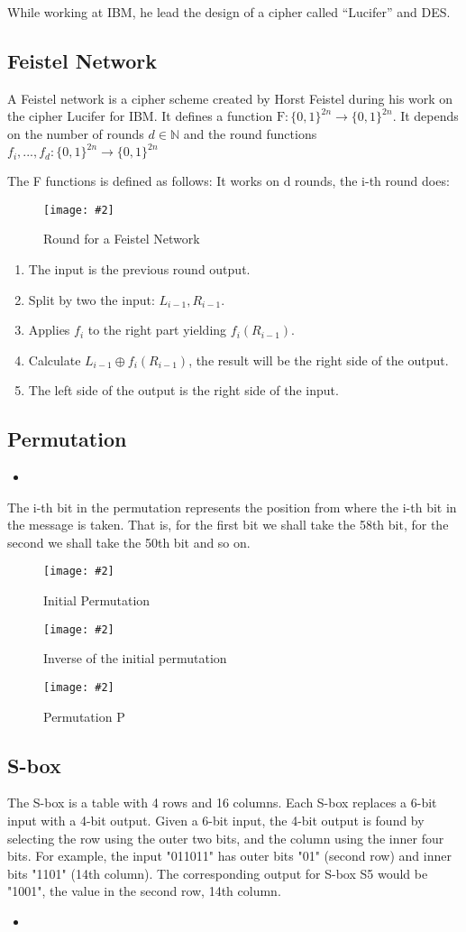 \documentclass[titlepage, 12pt]{article}
\numberwithin{equation}{section}%
\numberwithin{figure}{section}%
\numberwithin{table}{section}%
\newcommand{\imagen}[4][]{
	\begin{figure}[H]
		\centering
		\texttt{[image: \#2]}
		\caption{#3}
		#4
	\end{figure}
}
\newcommand{\delimitCodeScript}[6][]{
	\begin{itemize}
		\item[]
	\end{itemize}	
}
\begin{document}
		While working at IBM, he lead the design of a cipher called ``Lucifer'' and DES.\cite{feistelbiography}
		\subsection{Feistel Network}
		A Feistel network is a cipher scheme created by Horst Feistel during his work on the cipher Lucifer for IBM. It defines a function $\text{F}: \{0,1\}^{2n} \rightarrow\{0,1\}^{2n}$. It depends on the number of rounds $d \in \mathbb{N}$ and the round functions $f_{i}, ..., f_{d}: \{0,1\}^{2n} \rightarrow\{0,1\}^{2n}$
		
		The F functions is defined as follows: It works on d rounds, the i-th round does:
		\imagen[]{Picture1}{Round for a Feistel Network}{\label{FeistelRound}}
		\begin{enumerate}
			\item The input is the previous round output.
			\item Split by two the input: $L_{i-1}, R_{i-1}$.
			\item Applies $f_i$ to the right part yielding $f_{i}(R_{i-1})$.
			\item Calculate $L_{i-1} \oplus f_{i}(R_{i-1})$, the result will be the right side of the output.
			\item The left side of the output is the right side of the input.
		\end{enumerate}\cite{feistel}
		\subsection{Permutation}
		\delimitCodeScript{c}{des}{DES'Permutations}{69}{94}
		The i-th bit in the permutation represents the position from where the i-th bit in the message is taken. That is, for the first bit we shall take the 58th bit, for the second we shall take the 50th bit and so on.
		\imagen[width=\linewidth]{DES-ip}{Initial Permutation}{\cite{DESIP}\label{IP}}
		\imagen[width=\linewidth]{DES-ip-1}{Inverse of the initial permutation}{\cite{DESIP-1}\label{IP-1}}
		\imagen[width=\linewidth]{DES-pp}{Permutation P}{\cite{DESP}\label{P}}
		\subsection{S-box}
		The S-box is a table with 4 rows and 16 columns. Each S-box replaces a 6-bit input with a 4-bit output. Given a 6-bit input, the 4-bit output is found by selecting the row using the outer two bits, and the column using the inner four bits. For example, the input "011011" has outer bits "01" (second row) and inner bits "1101" (14th column). The corresponding output for S-box S5 would be "1001", the value in the second row, 14th column.
		\begin{landscape}
			\delimitCodeScript{c}{des}{DES' S-boxes}{36}{67}
		\end{landscape}
\end{document}
